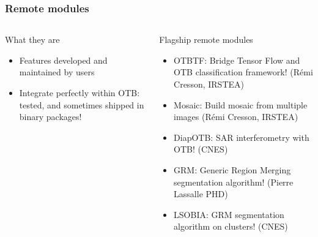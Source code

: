 \documentclass[8pt,aspectratio=169]{beamer}
\begin{document}
    \begin{frame}
    \frametitle{Remote modules}

    \begin{columns}
    \begin{block}{What they are}
      \begin{itemize}
      \item Features developed and maintained by users
      \item Integrate perfectly within OTB: tested, and sometimes shipped in binary packages!  
      \end{itemize}
    \end{block}
    
    \begin{block}{Flagship remote modules}
      \begin{itemize}
      \item OTBTF: Bridge Tensor Flow and OTB classification framework! (Rémi Cresson, IRSTEA)
      \item Mosaic: Build mosaic from multiple images (Rémi Cresson, IRSTEA)
      \item DiapOTB: SAR interferometry with OTB! (CNES)
      \item GRM: Generic Region Merging segmentation algorithm! (Pierre Lassalle PHD)
      \item LSOBIA: GRM segmentation algorithm on clusters! (CNES)
        
      \end{itemize}
      

\end{block}
\end{columns}
\end{frame}
\end{document}
